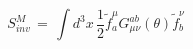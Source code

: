 \begin{equation}\label{eq:mink}
S_{inv}^M \,=\, \int d^3x \,\frac{1}{2} {\tilde f}^\mu_a
G_{\mu\nu}^{ab}(\theta){\tilde f}^\nu_b
\end{equation}

